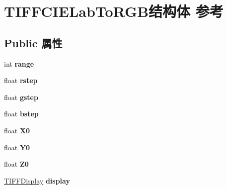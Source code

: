 \hypertarget{struct_t_i_f_f_c_i_e_lab_to_r_g_b}{}\section{T\+I\+F\+F\+C\+I\+E\+Lab\+To\+R\+G\+B结构体 参考}
\label{struct_t_i_f_f_c_i_e_lab_to_r_g_b}
\subsection*{Public 属性}
\begin{DoxyCompactItemize}
\item 
\mbox{\label{struct_t_i_f_f_c_i_e_lab_to_r_g_b_a09af471c6d9ffcca9c19de97f20920ff}} 
int {\bfseries range}
\item 
\mbox{\label{struct_t_i_f_f_c_i_e_lab_to_r_g_b_a9b213644566df7faeb5b9fec670d471e}} 
float {\bfseries rstep}
\item 
\mbox{\label{struct_t_i_f_f_c_i_e_lab_to_r_g_b_aa8377803e7a29c4a2febe3bb072d56b2}} 
float {\bfseries gstep}
\item 
\mbox{\label{struct_t_i_f_f_c_i_e_lab_to_r_g_b_a31b54e135a7ba968e985d3d87df1cbd8}} 
float {\bfseries bstep}
\item 
\mbox{\label{struct_t_i_f_f_c_i_e_lab_to_r_g_b_a5af05f3959746297faad382d4789d9df}} 
float {\bfseries X0}
\item 
\mbox{\label{struct_t_i_f_f_c_i_e_lab_to_r_g_b_ae11810aa51c4bfb3f9ff132c04cfb05c}} 
float {\bfseries Y0}
\item 
\mbox{\label{struct_t_i_f_f_c_i_e_lab_to_r_g_b_a66f412761ac9c5c752e5d63b16fec950}} 
float {\bfseries Z0}
\item 
\mbox{\label{struct_t_i_f_f_c_i_e_lab_to_r_g_b_a95a9dabc0ec6759e6cd85c51fcae72ec}} 
\hyperlink{struct_t_i_f_f_display}{T\+I\+F\+F\+Display} {\bfseries display}
\item 

\end{DoxyCompactItemize}
